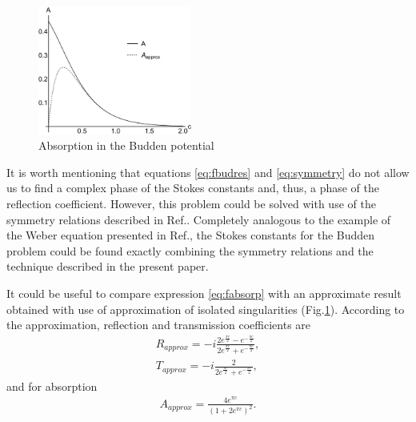 \documentclass[aip,jmp,reprint]{revtex4-1}
\def\mytextwidth{0.45\textwidth}
\begin{document}
\begin{figure}
\centering
\noindent
\includegraphics[width=\mytextwidth]{stuff/absorp.png}
\caption{Absorption in the Budden potential}
\label{fig:absorp}
\end{figure} 

It is worth mentioning that equations \eqref{eq:fbudres} and \eqref{eq:symmetry} do not allow us
to find a complex phase of the Stokes constants and, thus, a phase of the reflection coefficient.
However, this problem could be solved with use of the symmetry relations described in 
Ref.. Completely analogous to the example of the Weber equation presented in
Ref., the Stokes constants for the Budden problem could be found exactly combining
the symmetry relations and the technique described in the present paper.

It could be useful to compare expression \eqref{eq:fabsorp} with an approximate result 
obtained with use of approximation of isolated singularities (Fig.\ref{fig:absorp}). According to the 
approximation\cite{rwbook}, reflection and transmission coefficients are
\begin{eqnarray}
R_{approx}=-i\frac{2e^{\frac{\pi c}{2}}-e^{-\frac{\pi c}{2}}}{2e^{\frac{\pi c}{2}}+e^{-\frac{\pi c}{2}}},
\\
T_{approx}=-i\frac{2}{2e^{\frac{\pi c}{2}}+e^{-\frac{\pi c}{2}}},
\end{eqnarray}
and for absorption
\begin{eqnarray}
A_{approx} = \frac{4 e^{\pi c}}{(1+2e^{\pi c})^2}.
\end{eqnarray}
\end{document}
